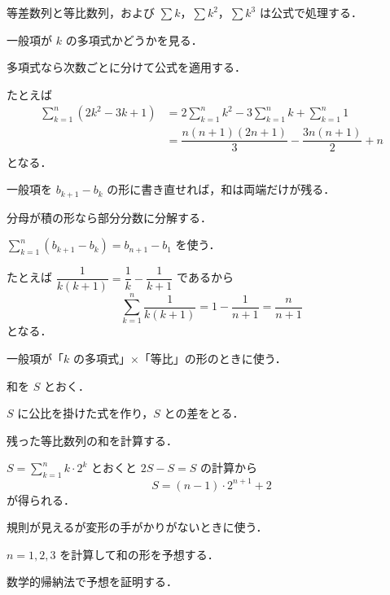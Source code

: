\documentclass[lualatex,paper=b5j,fontsize=10pt,twoside]{jlreq}
\begin{document}
\MakeMathMagazineTitle
\MSPatternReset


等差数列と等比数列，および $\sum k$，$\sum k^2$，$\sum k^3$ は公式で処理する．

\begin{msprocedure}
  \item 一般項が $k$ の多項式かどうかを見る．
  \item 多項式なら次数ごとに分けて公式を適用する．
\end{msprocedure}

たとえば
\begin{align*}
  \sum_{k=1}^{n}(2k^2-3k+1)
    &= 2\sum_{k=1}^{n}k^2-3\sum_{k=1}^{n}k+\sum_{k=1}^{n}1\\
    &= \dfrac{n(n+1)(2n+1)}{3}-\dfrac{3n(n+1)}{2}+n
\end{align*}
となる．


一般項を $b_{k+1}-b_k$ の形に書き直せれば，和は両端だけが残る．

\begin{msprocedure}
  \item 分母が積の形なら部分分数に分解する．
  \item $\sum_{k=1}^{n}(b_{k+1}-b_k)=b_{n+1}-b_1$ を使う．
\end{msprocedure}

たとえば $\dfrac{1}{k(k+1)}=\dfrac{1}{k}-\dfrac{1}{k+1}$ であるから
\[
  \sum_{k=1}^{n}\dfrac{1}{k(k+1)}=1-\dfrac{1}{n+1}=\dfrac{n}{n+1}
\]
となる．


一般項が「$k$ の多項式」×「等比」の形のときに使う．

\begin{msprocedure}
  \item 和を $S$ とおく．
  \item $S$ に公比を掛けた式を作り，$S$ との差をとる．
  \item 残った等比数列の和を計算する．
\end{msprocedure}

$S=\sum_{k=1}^{n}k\cdot 2^{k}$ とおくと $2S-S=S$ の計算から
\[
  S=(n-1)\cdot 2^{n+1}+2
\]
が得られる．


規則が見えるが変形の手がかりがないときに使う．

\begin{msprocedure}
  \item $n=1,2,3$ を計算して和の形を予想する．
  \item 数学的帰納法で予想を証明する．
\end{msprocedure}
\end{document}
